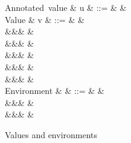 \begin{figure}
\begin{syntaxfig}
\small
\mbox{Annotated value}
&
u
&
::=
&
&
\\[1mm]
\mbox{Value}
&
v
&
::=
&
\exUnit
&
\\
&&&
&
\\
&&&
&
\\
&&&
&
\\
&&&
\exClosure{\rho}{\exFun{\sigma}}
&
\\
&&&
&
\\[1mm]
\mbox{Environment}
&
\rho
&
::=
&
\envEmpty
&
\\
&&&
&
\\
&&&
&
\end{syntaxfig}
\caption{Values and environments}
\end{figure}
